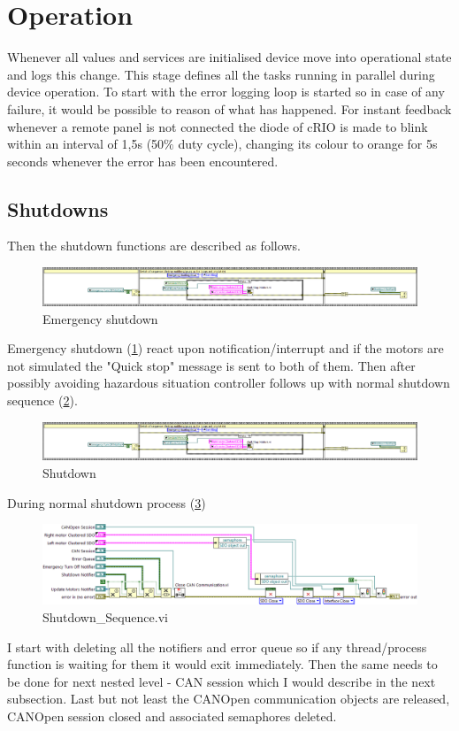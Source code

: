 \section{Operation}
Whenever all values and services are initialised device move into operational state and logs this change.
This stage defines all the tasks running in parallel during device operation. To start with the error logging loop is started so in case of any failure, it would be possible to reason of what has happened. 
For instant feedback whenever a remote panel is not connected the diode of cRIO is made to blink within an interval of 1,5s (50$\%$ duty cycle), changing its colour to orange for 5s seconds whenever the error has been encountered.\label{cRIO_LED}

\subsection{Shutdowns}
Then the shutdown functions are described as follows.
\begin{figure}[h]
    \centering
    \includegraphics[width=\textwidth]{figures/Emergency_turn_off}
    \caption{Emergency shutdown}
    \label{vi:emc_shut}
\end{figure}
Emergency shutdown (\ref{vi:emc_shut}) react upon notification/interrupt and if the motors are not simulated the "Quick stop" message is sent to both of them. Then after possibly avoiding hazardous situation controller follows up with normal shutdown sequence (\ref{vi:shut}).
\begin{figure}[h]
    \centering
    \includegraphics[width=\textwidth]{figures/Emergency_turn_off}
    \caption{Shutdown}
    \label{vi:shut}
\end{figure}

During normal shutdown process (\ref{vi:shut_seq})
\begin{figure}[h]
    \centering
    \includegraphics[width=\textwidth]{figures/Shutdown_Sequenced}
    \caption{Shutdown\_Sequence.vi}
    \label{vi:shut_seq}
\end{figure}
I start with deleting all the notifiers and error queue so if any thread/process function is waiting for them it would exit immediately.
Then the same needs to be done for next nested level - CAN session which I would describe in the next subsection.
Last but not least the CANOpen communication objects are released, CANOpen session closed and associated semaphores deleted. 

